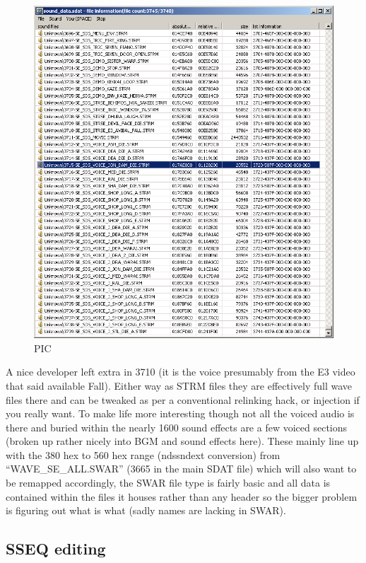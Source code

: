 \documentclass[
]{book}
\begin{document}
\begin{figure}
\centering
\includegraphics{images/152_home_fast6191_romhackingguide_unrenamed_fil___inal_borders_romhackguideSDATcomplexundub_1.png}
\caption{PIC}
\end{figure}

A nice developer left extra in 3710 (it is the voice presumably from the E3 video that said available Fall). Either way as STRM files they are effectively full wave files there and can be tweaked as per a conventional relinking hack, or injection if you really want. To make life more interesting though not all the voiced audio is there and buried within the nearly 1600 sound effects are a few voiced sections (broken up rather nicely into BGM and sound effects here). These mainly line up with the 380 hex to 560 hex range (ndssndext conversion) from ``WAVE\_SE\_ALL.SWAR'' (3665 in the main SDAT file) which will also want to be remapped accordingly, the SWAR file type is fairly basic and all data is contained within the files it houses rather than any header so the bigger problem is figuring out what is what (sadly names are lacking in SWAR).

\hypertarget{sseq-editing}{%
\subsection{SSEQ editing}\label{sseq-editing}}
\end{document}
